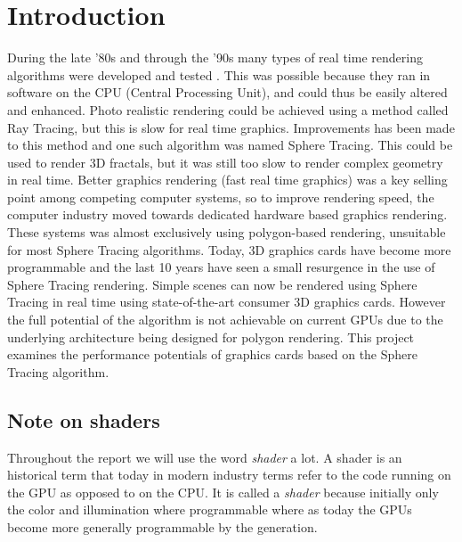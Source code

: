 \chapter{Introduction} 	

	During the late '80s and through the '90s many types of real time rendering
	algorithms were developed and tested \cite{Hart1989}. This was possible
	because they ran in software on the	CPU (Central Processing Unit), and
	could thus be easily altered and enhanced. Photo realistic rendering could
	be achieved using a method called Ray Tracing, but this is slow for real time
	graphics\cite{PeterShirleyMichaelAshikhmin2005}. Improvements has been made 
	to this method and one
	such algorithm was named Sphere Tracing. This could be used to render 3D
	fractals\cite{Hart1989}, but it was	still too slow to render complex
	geometry in real time\cite{Hart1989}. Better graphics rendering (fast real
	time graphics) was a key selling point among competing computer systems, so
	to improve rendering speed, the computer industry moved towards dedicated
	hardware based graphics rendering\cite{Houston2010}. These systems was
	almost exclusively using polygon-based	rendering, unsuitable for most
	Sphere Tracing algorithms. Today, 3D graphics cards have become more
	programmable and the last 10 years have seen a small resurgence in the use
	of Sphere Tracing rendering\cite{Quilez2008}. Simple scenes can now be
	rendered using Sphere Tracing in real time using state-of-the-art consumer
	3D graphics cards. However the full potential of the algorithm is not
	achievable on current GPUs due to the underlying architecture being
	designed for polygon rendering\cite{Houston2010}. This project examines the
	performance	potentials of graphics cards based on the Sphere Tracing 
	algorithm.

	\section{Note on shaders} 
		
		Throughout the report we will use the word \emph{shader} a lot. A
		shader is an historical term that today in modern industry terms refer to
		the code running on the GPU as opposed to on the CPU. It is called a
		\emph{shader} because initially only the color and illumination where
		programmable where as today the GPUs become more generally programmable by
		the generation. 

